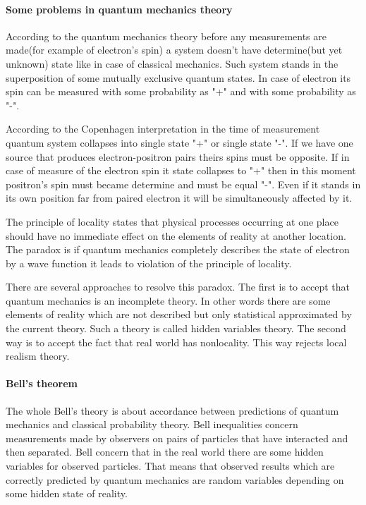 \documentclass[12pt]{article}
\begin{document}
\paragraph{Some problems in quantum mechanics theory} According to the quantum mechanics theory before any measurements are made(for example of electron's spin) a system doesn't have determine(but yet unknown) state like in case of classical mechanics. Such system stands in the superposition of some mutually exclusive quantum states. In case of electron its spin can be measured with some probability as "+" and with some probability as "-".

According to the Copenhagen interpretation in the time of measurement quantum system collapses into single state "+" or single state "-". If we have one source that produces electron-positron pairs theirs spins must be opposite. If in case of measure of the electron spin it state collapses to "+" then in this moment positron's spin must became determine and must be equal "-". Even if it stands in its own position far from paired electron it will be simultaneously affected by it.

The principle of locality states that physical processes occurring at one place should have no immediate effect on the elements of reality at another location. The paradox is if quantum mechanics completely describes the state of electron by a wave function it leads to violation of the principle of locality.

There are several approaches to resolve this paradox. The first is to accept that quantum mechanics is an incomplete theory. In other words there are some elements of reality which are not described but only statistical approximated by the current theory. Such a theory is called hidden variables theory. The second way is to accept the fact that real world has nonlocality. This way rejects local realism theory.

\paragraph{Bell's theorem} The whole Bell's theory is about accordance between predictions of quantum mechanics and classical probability theory. Bell inequalities concern measurements made by observers on pairs of particles that have interacted and then separated. Bell concern that in the real world there are some hidden variables for observed particles. That means that observed results which are correctly predicted by quantum mechanics are random variables depending on some hidden state of reality. 
\end{document}
